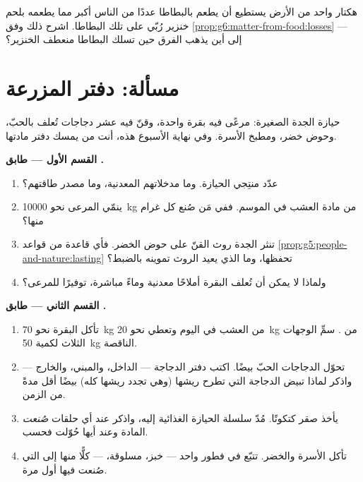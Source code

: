 \begin{exercise}[$\star\star\star$]\label{exo:g6:matter-from-food:12}
هكتار واحد من الأرض يستطيع أن يطعم بالبطاطا عددًا من الناس أكبر
مما يطعمه بلحم خنزير رُبّي على تلك البطاطا. اشرح ذلك وفق
\cref{prop:g6:matter-from-food:losses} --- إلى أين يذهب الفرق حين
تسلك البطاطا منعطف الخنزير؟
\end{exercise}

\section{مسألة: دفتر المزرعة}

\begin{problem}\label{pb:g6:matter-from-food:1}
حيازة الجدة الصغيرة: مرعًى فيه بقرة واحدة، وقنّ فيه عشر دجاجات
تُعلف بالحبّ، وحوض خضر، ومطبخ الأسرة. وفي نهاية الأسبوع هذه، أنت
من يمسك دفتر مادتها.

\medskip\noindent\textbf{القسم الأول --- طابق .}
\begin{enumerate}
  \item عدّد منتِجي الحيازة. وما مدخلاتهم المعدنية، وما مصدر
        طاقتهم؟
  \item ينمّي المرعى نحو \qty{10000}{kg} من مادة العشب في الموسم.
        ففي  مَن صُنع كل غرام منها؟
  \item تنثر الجدة روث القنّ على حوض الخضر. فأي قاعدة من قواعد
        \cref{prop:g5:people-and-nature:lasting} تحفظها، وما
        الذي يعيد الروث تموينه بالضبط؟
  \item ولماذا لا يمكن أن تُعلف البقرة أملاحًا معدنية وماءً
        مباشرة، توفيرًا للمرعى؟
\end{enumerate}

\medskip\noindent\textbf{القسم الثاني --- طابق .}
\begin{enumerate}[resume]
  \item تأكل البقرة نحو \qty{70}{kg} من العشب في اليوم وتعطي نحو
        \qty{20}{kg} من . سمِّ الوجهات الثلاث لكمية
        \qty{50}{kg} الناقصة.
  \item تحوّل الدجاجات الحبّ بيضًا. اكتب دفتر الدجاجة --- الداخل،
        والمبني، والخارج --- واذكر لماذا تبيض الدجاجة التي تطرح
        ريشها (وهي تجدد ريشها كله) بيضًا أقل مدةً من الزمن.
  \item يأخذ صقر كتكوتًا. مُدّ سلسلة الحيازة الغذائية إليه، واذكر
        عند أي حلقات \emph{صُنعت} المادة وعند أيها حُوّلت فحسب.
  \item تأكل الأسرة   والخضر. تتبّع  في
        فطور واحد --- خبز،  مسلوقة،  --- كلًّا منها إلى
         التي صُنعت فيها أول مرة.
\end{enumerate}


\end{problem}
